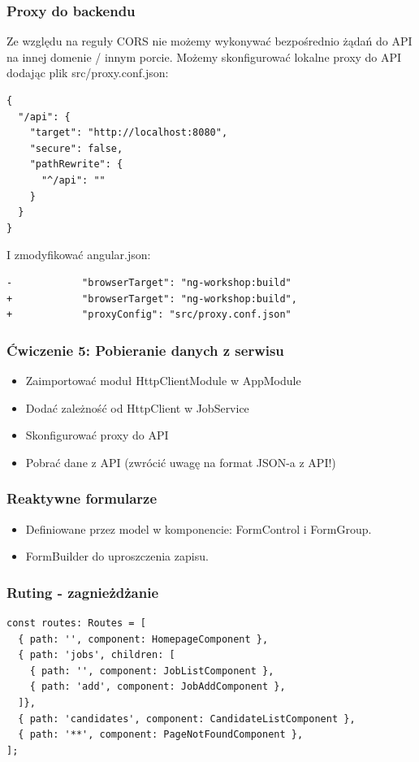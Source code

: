 \documentclass{beamer}
\begin{document}
\begin{frame}[fragile]
    \frametitle{Proxy do backendu}
    \tiny
    Ze względu na reguły CORS nie możemy wykonywać bezpośrednio żądań do API na innej domenie / innym porcie.
    Możemy skonfigurować lokalne proxy do API dodając plik src/proxy.conf.json:
\begin{lstlisting}
{
  "/api": {
    "target": "http://localhost:8080",
    "secure": false,
    "pathRewrite": {
      "^/api": ""
    }
  }
}
\end{lstlisting}
    I zmodyfikować angular.json:
\begin{lstlisting}
-            "browserTarget": "ng-workshop:build"
+            "browserTarget": "ng-workshop:build",
+            "proxyConfig": "src/proxy.conf.json"
\end{lstlisting}

\end{frame}

\begin{frame}
    \frametitle{Ćwiczenie 5: Pobieranie danych z serwisu}
    \begin{itemize}
        \item Zaimportować moduł HttpClientModule w AppModule
        \item Dodać zależność od HttpClient w JobService
        \item Skonfigurować proxy do API
        \item Pobrać dane z API (zwrócić uwagę na format JSON-a z API!)
    \end{itemize}
\end{frame}

\begin{frame}
    \frametitle{Reaktywne formularze}
    \begin{itemize}
        \item Definiowane przez model w komponencie: FormControl i FormGroup.
        \item FormBuilder do uproszczenia zapisu.
    \end{itemize}
\end{frame}

\begin{frame}[fragile]
    \frametitle{Ruting - zagnieżdżanie}
\begin{lstlisting}
const routes: Routes = [
  { path: '', component: HomepageComponent },
  { path: 'jobs', children: [
    { path: '', component: JobListComponent },
    { path: 'add', component: JobAddComponent },
  ]},
  { path: 'candidates', component: CandidateListComponent },
  { path: '**', component: PageNotFoundComponent },
];
\end{lstlisting}
\end{frame}
\end{document}
